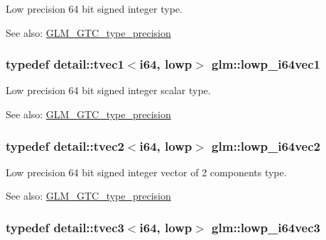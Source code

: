 Low precision 64 bit signed integer type. \begin{Desc}
\item[See also:]\hyperlink{group__gtc__type__precision}{GLM\_\-GTC\_\-type\_\-precision} \end{Desc}
\hypertarget{group__gtc__type__precision_gf427ced1906a1788fdd9faab2e57c60a}{
\subsubsection[lowp\_\-i64vec1]{\setlength{\rightskip}{0pt plus 5cm}typedef detail::tvec1$<$i64, lowp$>$ {\bf glm::lowp\_\-i64vec1}}}
\label{group__gtc__type__precision_gf427ced1906a1788fdd9faab2e57c60a}


Low precision 64 bit signed integer scalar type. \begin{Desc}
\item[See also:]\hyperlink{group__gtc__type__precision}{GLM\_\-GTC\_\-type\_\-precision} \end{Desc}
\hypertarget{group__gtc__type__precision_gd88a04aaa07fabf57fdbad8e6b7bcc9c}{
\subsubsection[lowp\_\-i64vec2]{\setlength{\rightskip}{0pt plus 5cm}typedef detail::tvec2$<$i64, lowp$>$ {\bf glm::lowp\_\-i64vec2}}}
\label{group__gtc__type__precision_gd88a04aaa07fabf57fdbad8e6b7bcc9c}


Low precision 64 bit signed integer vector of 2 components type. \begin{Desc}
\item[See also:]\hyperlink{group__gtc__type__precision}{GLM\_\-GTC\_\-type\_\-precision} \end{Desc}
\hypertarget{group__gtc__type__precision_ga42f666ccdb6d1ef6326882b4f377678}{
\subsubsection[lowp\_\-i64vec3]{\setlength{\rightskip}{0pt plus 5cm}typedef detail::tvec3$<$i64, lowp$>$ {\bf glm::lowp\_\-i64vec3}}}
\label{group__gtc__type__precision_ga42f666ccdb6d1ef6326882b4f377678}


